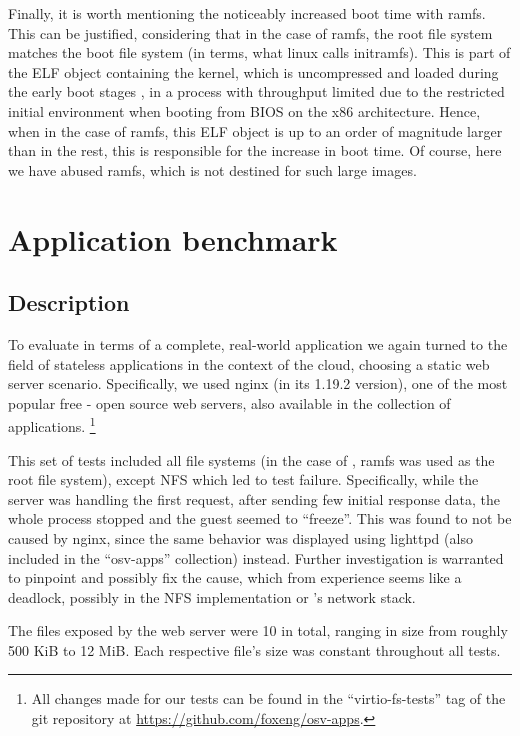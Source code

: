 Finally, it is worth mentioning the noticeably increased \osv{} boot time with
ramfs. This can be justified, considering that in the case of ramfs, the root
file system matches the boot file system (in \osv{} terms, what linux calls
initramfs). This is part of the ELF object containing the kernel, which is
uncompressed and loaded during the early boot stages \cite{osv-wiki:early-boot},
in a process with throughput limited due to the restricted initial environment
when booting from BIOS on the x86 architecture. Hence, when in the case of
ramfs, this ELF object is up to an order of magnitude larger than in the rest,
this is responsible for the increase in boot time. Of course, here we have
abused ramfs, which is not destined for such large images.

\section{Application benchmark}

\subsection{Description}

To evaluate \viofs{} in terms of a complete, real-world application we again
turned to the field of stateless applications in the context of the cloud,
choosing a static web server scenario. Specifically, we used nginx \cite{nginx}
(in its 1.19.2 version), one of the most popular free - open source web servers,
also available in the collection of \osv{} applications.%
\footnote{All changes made for our tests can be found in the ``virtio-fs-tests''
tag of the git repository at \url{https://github.com/foxeng/osv-apps}.}

This set of tests included all \osv{} file systems (in the case of \viofs{},
ramfs was used as the root file system), except NFS which led to test failure.
Specifically, while the server was handling the first request, after sending
few initial response data, the whole process stopped and the guest seemed to
``freeze''. This was found to not be caused by nginx, since the same behavior
was displayed using lighttpd (also included in the ``osv-apps'' collection)
instead. Further investigation is warranted to pinpoint and possibly fix the
cause, which from experience seems like a deadlock, possibly in the NFS
implementation or \osv{}'s network stack.

The files exposed by the web server were 10 in total, ranging in size from
roughly 500 KiB to 12 MiB. Each respective file's size was constant throughout
all tests.

